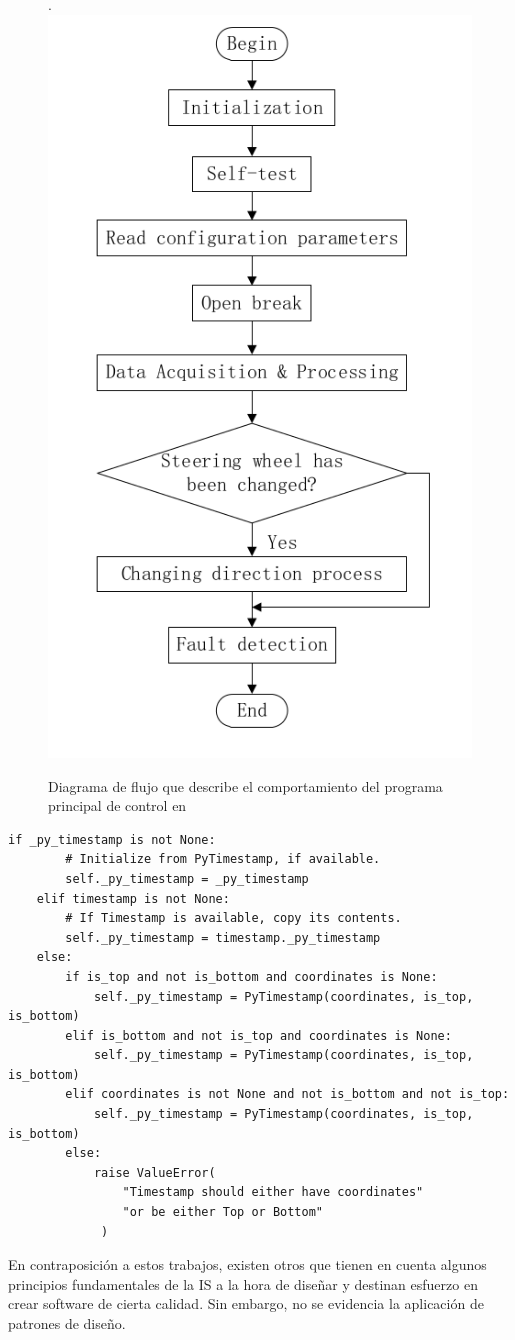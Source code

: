 \begin{figure}[H]
	\centering
	\caption{Diagrama de flujo que describe el comportamiento del programa principal de control en \cite{bad-desing-auto}}.
	\label{flujo}
    \includegraphics[width=0.41\linewidth]{main_flujo.png}
\end{figure}

\begin{lstlisting}[caption=Extracto de código de \cite{code-2}.,label={ifanidados}]
 if _py_timestamp is not None:
        # Initialize from PyTimestamp, if available.
        self._py_timestamp = _py_timestamp
    elif timestamp is not None:
        # If Timestamp is available, copy its contents.
        self._py_timestamp = timestamp._py_timestamp
    else:
        if is_top and not is_bottom and coordinates is None:
            self._py_timestamp = PyTimestamp(coordinates, is_top, is_bottom)
        elif is_bottom and not is_top and coordinates is None:
            self._py_timestamp = PyTimestamp(coordinates, is_top, is_bottom)
        elif coordinates is not None and not is_bottom and not is_top:
            self._py_timestamp = PyTimestamp(coordinates, is_top, is_bottom)
        else:
            raise ValueError(
                "Timestamp should either have coordinates"
                "or be either Top or Bottom"
             )
\end{lstlisting}


En contraposición a estos trabajos, existen otros \cite{good-desing-agrobot,good-desing-street} que tienen en cuenta algunos principios fundamentales de la \gls{IS} a la hora de diseñar y destinan esfuerzo en crear software de cierta calidad. Sin embargo, no se evidencia la aplicación de patrones de diseño.

